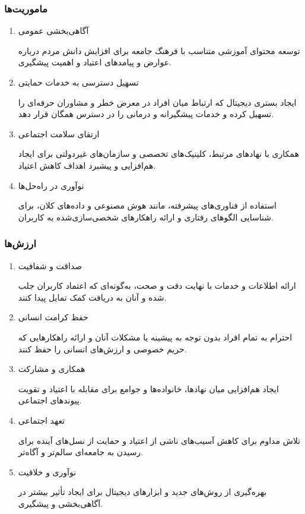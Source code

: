 \documentclass[dvipsnames, svgnames, x11names, 11pt]{article}
\begin{document}
\subsubsection{ماموریت‌‌ها}
\begin{enumerate}
\item 
آگاهی‌بخشی عمومی

توسعه محتوای آموزشی متناسب با فرهنگ جامعه برای افزایش دانش مردم درباره عوارض و پیامدهای اعتیاد و اهمیت پیشگیری.  

\item 
تسهیل دسترسی به خدمات حمایتی

ایجاد بستری دیجیتال که ارتباط میان افراد در معرض خطر و مشاوران حرفه‌ای را تسهیل کرده و خدمات پیشگیرانه و درمانی را در دسترس همگان قرار دهد.  
\item 
ارتقای سلامت اجتماعی

همکاری با نهادهای مرتبط، کلینیک‌های تخصصی و سازمان‌های غیردولتی برای ایجاد هم‌افزایی و پیشبرد اهداف کاهش اعتیاد.  

\item 
نوآوری در راه‌حل‌ها

استفاده از فناوری‌های پیشرفته، مانند هوش مصنوعی و داده‌های کلان، برای شناسایی الگوهای رفتاری و ارائه راهکارهای شخصی‌سازی‌شده به کاربران.
\end{enumerate}

\subsubsection{ارزش‌ها}
\begin{enumerate}
\item 
صداقت و شفافیت

ارائه اطلاعات و خدمات با نهایت دقت و صحت، به‌گونه‌ای که اعتماد کاربران جلب شده و آنان به دریافت کمک تمایل پیدا کنند.  

\item 
حفظ کرامت انسانی

احترام به تمام افراد بدون توجه به پیشینه یا مشکلات آنان و ارائه راهکارهایی که حریم خصوصی و ارزش‌های انسانی را حفظ کنند.  

\item 
همکاری و مشارکت

ایجاد هم‌افزایی میان نهادها، خانواده‌ها و جوامع برای مقابله با اعتیاد و تقویت پیوندهای اجتماعی.  

\item 
تعهد اجتماعی

تلاش مداوم برای کاهش آسیب‌های ناشی از اعتیاد و حمایت از نسل‌های آینده برای رسیدن به جامعه‌ای سالم‌تر و آگاه‌تر.  

\item 
نوآوری و خلاقیت

بهره‌گیری از روش‌های جدید و ابزارهای دیجیتال برای ایجاد تأثیر بیشتر در آگاهی‌بخشی و پیشگیری.
\end{enumerate}
\end{document}
